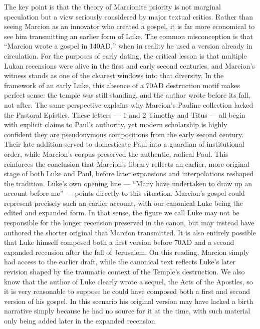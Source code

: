 The key point is that the theory of Marcionite priority is not marginal speculation but a view seriously considered by major textual critics.
Rather than seeing Marcion as an innovator who created a gospel, it is far more economical to see him transmitting an earlier form of Luke.
The common misconception is that “Marcion wrote a gospel in 140AD,” when in reality he used a version already in circulation.
For the purposes of early dating, the critical lesson is that multiple Lukan recensions were alive in the first and early second centuries, and Marcion’s witness stands as one of the clearest windows into that diversity.
In the framework of an early Luke, this absence of a 70AD destruction motif makes perfect sense: the temple was still standing, and the author wrote before its fall, not after.
The same perspective explains why Marcion’s Pauline collection lacked the Pastoral Epistles.
These letters — 1 and 2 Timothy and Titus — all begin with explicit claims to Paul’s authority, yet modern scholarship is highly confident they are pseudonymous compositions from the early second century.
Their late addition served to domesticate Paul into a guardian of institutional order, while Marcion’s corpus preserved the authentic, radical Paul.
This reinforces the conclusion that Marcion’s library reflects an earlier, more original stage of both Luke and Paul, before later expansions and interpolations reshaped the tradition.
Luke’s own opening line — “Many have undertaken to draw up an account before me” — points directly to this situation.
Marcion’s gospel could represent precisely such an earlier account, with our canonical Luke being the edited and expanded form.
In that sense, the figure we call Luke may not be responsible for the longer recension preserved in the canon, but may instead have authored the shorter original that Marcion transmitted.
It is also entirely possible that Luke himself composed both a first version before 70AD and a second expanded recension after the fall of Jerusalem.
On this reading, Marcion simply had access to the earlier draft, while the canonical text reflects Luke’s later revision shaped by the traumatic context of the Temple’s destruction.
We also know that the author of Luke clearly wrote a sequel, the Acts of the Apostles, so it is very reasonable to suppose he could have composed both a first and second version of his gospel.
In this scenario his original version may have lacked a birth narrative simply because he had no source for it at the time, with such material only being added later in the expanded recension.

